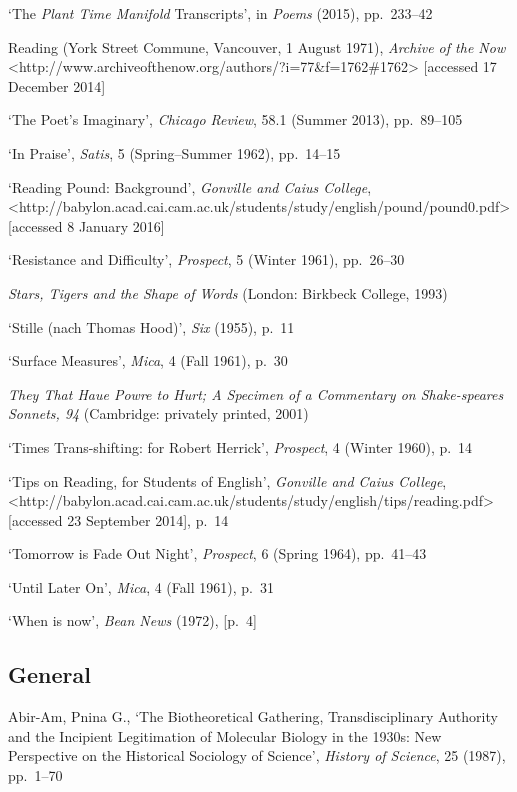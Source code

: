 \documentclass[]{article}
\begin{document}
`The \emph{Plant Time Manifold} Transcripts', in \emph{Poems} (2015),
pp.~233--42

Reading (York Street Commune, Vancouver, 1 August 1971), \emph{Archive
of the Now}\\
\textless{}http://www.archiveofthenow.org/authors/?i=77\&f=1762\#1762\textgreater{}
{[}accessed 17 December 2014{]}

`The Poet's Imaginary', \emph{Chicago Review}, 58.1 (Summer 2013),
pp.~89--105

`In Praise', \emph{Satis}, 5 (Spring--Summer 1962), pp.~14--15

`Reading Pound: Background', \emph{Gonville and Caius College},\\
\textless{}http://babylon.acad.cai.cam.ac.uk/students/study/english/pound/pound0.pdf\textgreater{}
{[}accessed 8 January 2016{]}

`Resistance and Difficulty', \emph{Prospect}, 5 (Winter 1961),
pp.~26--30

\emph{Stars, Tigers and the Shape of Words} (London: Birkbeck College,
1993)

`Stille (nach Thomas Hood)', \emph{Six} (1955), p.~11

`Surface Measures', \emph{Mica}, 4 (Fall 1961), p.~30

\emph{They That Haue Powre to Hurt; A Specimen of a Commentary on
Shake-speares Sonnets, 94} (Cambridge: privately printed, 2001)

`Times Trans-shifting: for Robert Herrick', \emph{Prospect}, 4 (Winter
1960), p.~14

`Tips on Reading, for Students of English', \emph{Gonville and Caius
College},\\
\textless{}http://babylon.acad.cai.cam.ac.uk/students/study/english/tips/reading.pdf\textgreater{}
{[}accessed 23 September 2014{]}, p.~14

`Tomorrow is Fade Out Night', \emph{Prospect}, 6 (Spring 1964),
pp.~41--43

`Until Later On', \emph{Mica}, 4 (Fall 1961), p.~31

`When is now', \emph{Bean News} (1972), {[}p.~4{]}

\subsection{General}\label{general}

Abir-Am, Pnina G., `The Biotheoretical Gathering, Transdisciplinary
Authority and the Incipient Legitimation of Molecular Biology in the
1930s: New Perspective on the Historical Sociology of Science',
\emph{History of Science}, 25 (1987), pp.~1--70
\end{document}
